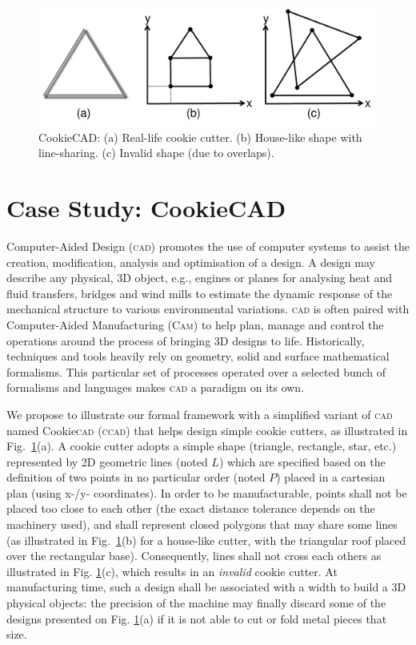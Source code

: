 \begin{figure}[t]
   \centering
   \includegraphics[width=\columnwidth]{CookieCAD.pdf}
   \caption{CookieCAD: (a) Real-life cookie cutter. (b) House-like 
shape with line-sharing. (c) Invalid shape (due to overlaps).}%
 
   \label{fig:CookieCAD}
\end{figure}

\section{Case Study: CookieCAD}
\label{sec:CS}

Computer-Aided Design (\textsc{cad}) \cite{B:Groover-Zimmers:2008} promotes the
use of computer systems to assist the creation, modification, analysis and
optimisation of a design.
A design may describe any physical, 3D object, e.g., engines or planes for
analysing heat and fluid transfers, bridges and wind mills to estimate the
dynamic response of the mechanical structure to various environmental
variations. \textsc{cad} is often paired with Computer-Aided Manufacturing
(\textsc{Cam}) to help plan, manage and control the operations around the
process of bringing 3D designs to life. Historically, techniques and tools
heavily rely on geometry, solid and surface mathematical formalisms. This
particular set of processes operated over a selected bunch of formalisms and
languages makes \textsc{cad} a paradigm on its own.

We propose to illustrate our formal framework with a simplified variant of 
\textsc{cad} named Cookie\textsc{cad} (\textsc{ccad}) that helps design simple 
cookie cutters, as illustrated in Fig.~\ref{fig:CookieCAD}(a). A cookie cutter 
adopts a simple shape (triangle, rectangle, star, etc.) represented by 2D geometric 
lines (noted $L$) which are specified based on the definition of two points in 
no particular order (noted $P$) placed in a cartesian plan (using x-/y- 
coordinates). In order to be manufacturable, points shall not be placed too 
close to each other (the exact distance tolerance depends on the machinery 
used), and shall represent closed polygons that may share some lines (as 
illustrated in Fig.~\ref{fig:CookieCAD}(b) for a house-like cutter, with the 
triangular roof placed over the rectangular base). Consequently, lines shall not 
cross each others as illustrated in Fig. \ref{fig:CookieCAD}(c), which results 
in an \emph{invalid} cookie cutter. At manufacturing time, such a design shall 
be associated with a width to build a 3D physical objects: the precision of the 
machine may finally discard some of the designs presented on Fig. 
\ref{fig:CookieCAD}(a) if it is not able to cut or fold metal pieces that size.

